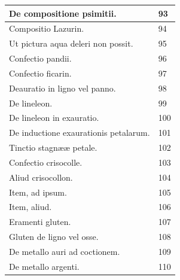 \documentclass[a4paper, 11pt, oneside, polutonikogreek, italian]{article}
\begin{document}
\begin{center}
\begin{longtable}{|p{60mm}|l|}
         De compositione psimitii.                                                       & 93 \\ \hline
         Compositio Lazurin.                                                             & 94 \\ \hline
         Ut pictura aqua deleri non possit.                                              & 95 \\ \hline
         Confectio pandii.                                                               & 96 \\ \hline
         Confectio ficarin.                                                              & 97 \\ \hline
         Deauratio in ligno vel panno.                                                   & 98 \\ \hline
         De lineleon.                                                                    & 99 \\ \hline
         De lineleon in exauratio.                                                       & 100 \\ \hline
         De inductione exaurationis petalarum.                                           & 101 \\ \hline
         Tinctio stagnææ petale.                                                         & 102 \\ \hline
         Confectio crisocolle.                                                           & 103 \\ \hline
         Aliud crisocollon.                                                              & 104 \\ \hline
         Item, ad ipsum.                                                                 & 105 \\ \hline
         Item, aliud.                                                                    & 106 \\ \hline
         Eramenti gluten.                                                                & 107 \\ \hline
         Gluten de ligno vel osse.                                                       & 108 \\ \hline
         De metallo auri ad coctionem.                                                   & 109 \\ \hline
         De metallo argenti.                                                             & 110 \\ \hline

\end{longtable}
\end{center}
\end{document}
